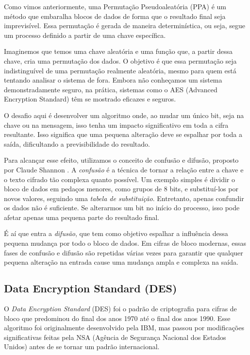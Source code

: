 Como vimos anteriormente, uma Permutação Pseudoaleatória (PPA) é um método que embaralha blocos de dados de forma que o resultado final seja imprevisível.
Essa permutação é gerada de maneira determinística, ou seja, segue um processo definido a partir de uma chave específica.

Imaginemos que temos uma chave aleatória e uma função que, a partir dessa chave, cria uma permutação dos dados.
O objetivo é que essa permutação seja indistinguível de uma permutação realmente aleatória, mesmo para quem está tentando analisar o sistema de fora.
Embora não conheçamos um sistema demonstradamente seguro, na prática, sistemas como o AES (Advanced Encryption Standard) têm se mostrado eficazes e seguros.

O desafio aqui é desenvolver um algoritmo onde, ao mudar um único bit, seja na chave ou na mensagem, isso tenha um impacto significativo em toda a cifra resultante.
Isso significa que uma pequena alteração deve se espalhar por toda a saída, dificultando a previsibilidade do resultado.

Para alcançar esse efeito, utilizamos o conceito de confusão e difusão, proposto por Claude Shannon \cite{Shannon49}.
A {\em confusão} é a técnica de tornar a relação entre a chave e o texto cifrado tão complexa quanto possível.
Um exemplo simples é dividir o bloco de dados em pedaços menores, como grupos de 8 bits, e substituí-los por novos valores, seguindo uma {\em tabela de substituição}.
Entretanto, apenas confundir os dados não é suficiente.
Se alterarmos um bit no início do processo, isso pode afetar apenas uma pequena parte do resultado final.

É aí que entra a {\em difusão}, que tem como objetivo espalhar a influência dessa pequena mudança por todo o bloco de dados.
Em cifras de bloco modernas, essas fases de confusão e difusão são repetidas várias vezes para garantir que qualquer pequena alteração na entrada cause uma mudança ampla e complexa na saída.


\subsection{Data Encryption Standard (DES)}
\label{sec:des}

O {\em Data Encryption Standard} (DES) foi o padrão de criptografia para cifras de bloco que predominou do final dos anos 1970 até o final dos anos 1990.
Esse algoritmo foi originalmente desenvolvido pela IBM, mas passou por modificações significativas feitas pela NSA (Agência de Segurança Nacional dos Estados Unidos) antes de se tornar um padrão internacional.

